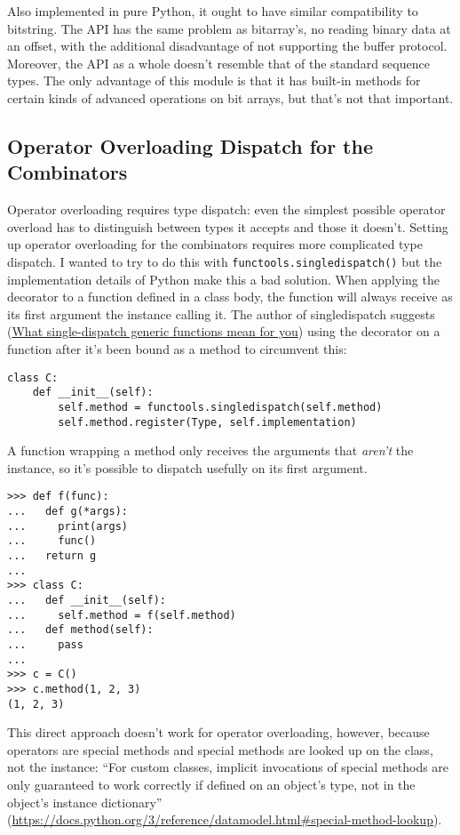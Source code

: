\documentclass[12pt]{article}
\begin{document}
Also implemented in pure Python, it ought to have similar
compatibility to bitstring.  The API has the same problem as
bitarray's, no reading binary data at an offset, with the additional
disadvantage of not supporting the buffer protocol.  Moreover, the API
as a whole doesn't resemble that of the standard sequence types.  The
only advantage of this module is that it has built-in methods for
certain kinds of advanced operations on bit arrays, but that's not
that important.


\subsection{Operator Overloading Dispatch for the Combinators}
\label{sec:operator_overloading_dispatch_combinators}

Operator overloading requires type dispatch: even the simplest
possible operator overload has to distinguish between types it accepts
and those it doesn't.  Setting up operator overloading for the
combinators requires more complicated type dispatch.  I wanted to try
to do this with \texttt{functools.singledispatch()} but the
implementation details of Python make this a bad solution.  When
applying the decorator to a function defined in a class body, the
function will always receive as its first argument the instance
calling it.  The author of singledispatch suggests
(\href{http://lukasz.langa.pl/8/single-dispatch-generic-functions/}{What
  single-dispatch generic functions mean for you}) using the decorator
on a function after it's been bound as a method to circumvent this:

\begin{lstlisting}
class C:
    def __init__(self):
        self.method = functools.singledispatch(self.method)
        self.method.register(Type, self.implementation)
\end{lstlisting}

A function wrapping a method only receives the arguments that
\emph{aren't} the instance, so it's possible to dispatch usefully on
its first argument.

\begin{lstlisting}
>>> def f(func):
...   def g(*args):
...     print(args)
...     func()
...   return g
... 
>>> class C:
...   def __init__(self):
...     self.method = f(self.method)
...   def method(self):
...     pass
... 
>>> c = C()
>>> c.method(1, 2, 3)
(1, 2, 3)
\end{lstlisting}

This direct approach doesn't work for operator overloading, however,
because operators are special methods and special methods are looked
up on the class, not the instance: ``For custom classes, implicit
invocations of special methods are only guaranteed to work correctly
if defined on an object's type, not in the object's instance
dictionary''
(\url{https://docs.python.org/3/reference/datamodel.html#special-method-lookup}).
\end{document}
